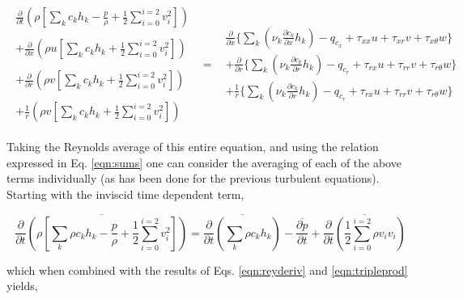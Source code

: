 \begin{displaymath}
	\begin{array}{ccc}
		\begin{array}{c}
		\frac{\partial}{\partial t}(\rho[\sum_{k}c_k h_k -\frac{p}{\rho} + \frac{1}{2}\sum_{i=0}^{i=2}v_i^2]) \\ \\
		+\frac{\partial}{\partial x}(\rho u[\sum_{k}c_k h_k + \frac{1}{2}\sum_{i=0}^{i=2}v_i^2]) \\ \\
		+ \frac{\partial}{\partial r}(\rho v[\sum_{k}c_k h_k + \frac{1}{2}\sum_{i=0}^{i=2}v_i^2]) \\ \\
		+ \frac{1}{r}(\rho v[\sum_{k}c_k h_k + \frac{1}{2}\sum_{i=0}^{i=2}v_i^2])
		\end{array} & = &
		\begin{array}{c}
			\frac{\partial}{\partial x}\Big\{
			\sum_k (\nu_k \frac{\partial c_k}{\partial x}h_k)
			- q_{c_x} +   \tau_{xx}u + \tau_{xr}v + \tau_{x\theta}w\Big\} \\
			+ \frac{\partial}{\partial r}\Big\{
			\sum_k (\nu_k \frac{\partial c_k}{\partial r}h_k)
			-  q_{c_r} + \tau_{rx}u +  \tau_{rr}v  + \tau_{r\theta}w\Big\} \\
			+\frac{1}{r}\Big\{\sum_k (\nu_k \frac{\partial c_k}{\partial r}h_k) - q_{c_r} + \tau_{rx}u 
			+ \tau_{rr}v + \tau_{r\theta}w\Big\}
		\end{array}  
	\end{array}
\end{displaymath}

	Taking the Reynolds average of this entire equation, and using the relation expressed in Eq. \ref{eqn:sums}
one can consider the averaging of each of the above terms individually (as has been done for the previous
turbulent equations).  Starting with the inviscid time dependent term,

\begin{displaymath}
	\overline{\frac{\partial}{\partial t}(\rho[\sum_{k} \rho c_k h_k -\frac{p}{\rho} + \frac{1}{2}
	\sum_{i=0}^{i=2}v_i^2])} =
	\overline{\frac{\partial}{\partial t}(\sum_{k}\rho c_k h_k)} - \overline{\frac{\partial p}{\partial t}} 
	+ \overline{\frac{\partial}{\partial t}(\frac{1}{2} \sum_{i=0}^{i=2} \rho v_i v_i)}
\end{displaymath}

	which when combined with the results of Eqs. \ref{eqn:reyderiv} and \ref{eqn:tripleprod} yields,

